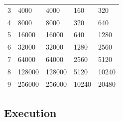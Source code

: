 \begin{table}
\begin{tabular}{lllll}
3                                           & 4000                                                       & 4000                                                  & 160                                                       & 320                                                                \\
4                                           & 8000                                                       & 8000                                                  & 320                                                       & 640                                                                \\
5                                           & 16000                                                      & 16000                                                 & 640                                                       & 1280                                                               \\
6                                           & 32000                                                      & 32000                                                 & 1280                                                      & 2560                                                               \\
7                                           & 64000                                                      & 64000                                                 & 2560                                                      & 5120                                                               \\
8                                           & 128000                                                     & 128000                                                & 5120                                                      & 10240                                                              \\
9                                           & 256000                                                     & 256000                                                & 10240                                                     & 20480                                                             
\end{tabular}
\end{table}

\subsection{Execution}

